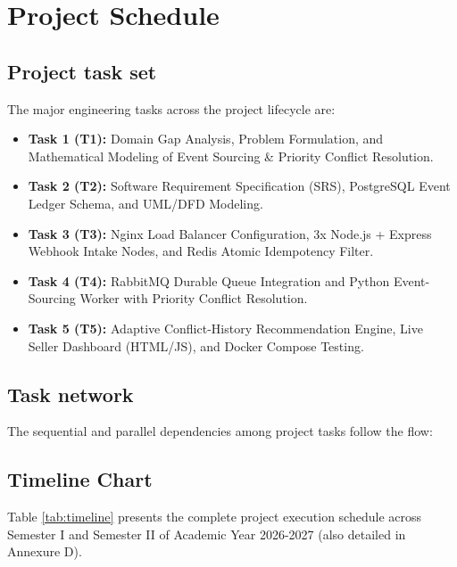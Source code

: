 \documentclass[oneside,a4paper,12pt]{report}
\newcommand{\AcademicYear}{2026-2027}
\begin{document}
\section{Project Schedule}
\subsection{Project task set}
The major engineering tasks across the project lifecycle are:
\begin{itemize}
  \item \textbf{Task 1 (T1):} Domain Gap Analysis, Problem Formulation, and Mathematical Modeling of Event Sourcing \& Priority Conflict Resolution.
  \item \textbf{Task 2 (T2):} Software Requirement Specification (SRS), PostgreSQL Event Ledger Schema, and UML/DFD Modeling.
  \item \textbf{Task 3 (T3):} Nginx Load Balancer Configuration, 3x Node.js + Express Webhook Intake Nodes, and Redis Atomic Idempotency Filter.
  \item \textbf{Task 4 (T4):} RabbitMQ Durable Queue Integration and Python Event-Sourcing Worker with Priority Conflict Resolution.
  \item \textbf{Task 5 (T5):} Adaptive Conflict-History Recommendation Engine, Live Seller Dashboard (HTML/JS), and Docker Compose Testing.
\end{itemize}

\subsection{Task network}
The sequential and parallel dependencies among project tasks follow the flow:
\begin{center}
\end{center}

\subsection{Timeline Chart}
Table \ref{tab:timeline} presents the complete project execution schedule across Semester I and Semester II of Academic Year \AcademicYear{} (also detailed in Annexure D).
\end{document}
